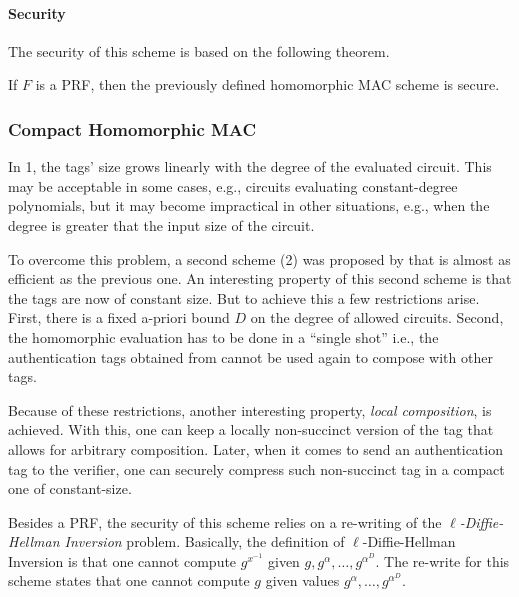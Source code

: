 \paragraph*{Security} The security of this scheme is based on the following
theorem.
\begin{theorem}
  If $F$ is a PRF, then the previously defined homomorphic MAC scheme is secure.
  \label{first-scheme-sec}
\end{theorem}

\subsubsection*{Compact Homomorphic MAC}
In 1, the tags' size grows linearly with the
degree of the evaluated circuit. This may be acceptable in some cases, e.g.,
circuits evaluating constant-degree polynomials, but it may become impractical
in other situations, e.g., when the degree is greater that the input size of
the circuit.

To overcome this problem, a second scheme (2)
was proposed by \citeauthor{catalano:fiore:2013} that is almost as efficient as
the previous one. An interesting property of this second scheme is that the
tags are now of constant size. But to achieve this a few restrictions arise.
First, there is a fixed a-priori bound $D$ on the degree of allowed circuits.
Second, the homomorphic evaluation has to be done in a ``single shot'' i.e.,
the authentication tags obtained from \Eval cannot be used again to compose
with other tags.

Because of these restrictions, another interesting property, \emph{local
composition}, is achieved. With this, one can keep a locally non-succinct
version of the tag that allows for arbitrary composition. Later, when it comes
to send an authentication tag to the verifier, one can securely compress such
non-succinct tag in a compact one of constant-size.

Besides a PRF, the security of this scheme relies on a re-writing of the
\emph{$\ell$-Diffie-Hellman Inversion} problem. Basically, the definition of
$\ell$-Diffie-Hellman Inversion is that one cannot compute $g^{x^{-1}}$ given
$g, g^\alpha, \dotsc, g^{\alpha^D}$.  The re-write for this scheme states that
one cannot compute $g$ given values $g^\alpha, \dotsc, g^{\alpha^D}$.

